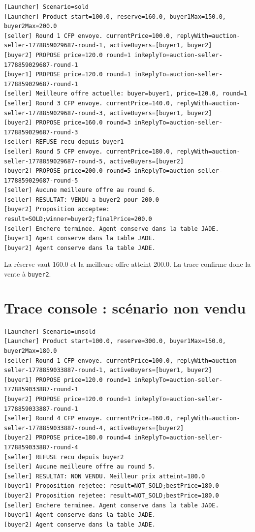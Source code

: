 \documentclass[11pt,a4paper]{report}
\begin{document}
\begin{lstlisting}
[Launcher] Scenario=sold
[Launcher] Product start=100.0, reserve=160.0, buyer1Max=150.0, buyer2Max=200.0
[seller] Round 1 CFP envoye. currentPrice=100.0, replyWith=auction-seller-1778859029687-round-1, activeBuyers=[buyer1, buyer2]
[buyer2] PROPOSE price=120.0 round=1 inReplyTo=auction-seller-1778859029687-round-1
[buyer1] PROPOSE price=120.0 round=1 inReplyTo=auction-seller-1778859029687-round-1
[seller] Meilleure offre actuelle: buyer=buyer1, price=120.0, round=1
[seller] Round 3 CFP envoye. currentPrice=140.0, replyWith=auction-seller-1778859029687-round-3, activeBuyers=[buyer1, buyer2]
[buyer2] PROPOSE price=160.0 round=3 inReplyTo=auction-seller-1778859029687-round-3
[seller] REFUSE recu depuis buyer1
[seller] Round 5 CFP envoye. currentPrice=180.0, replyWith=auction-seller-1778859029687-round-5, activeBuyers=[buyer2]
[buyer2] PROPOSE price=200.0 round=5 inReplyTo=auction-seller-1778859029687-round-5
[seller] Aucune meilleure offre au round 6.
[seller] RESULTAT: VENDU a buyer2 pour 200.0
[buyer2] Proposition acceptee: result=SOLD;winner=buyer2;finalPrice=200.0
[seller] Enchere terminee. Agent conserve dans la table JADE.
[buyer1] Agent conserve dans la table JADE.
[buyer2] Agent conserve dans la table JADE.
\end{lstlisting}

\begin{resultbox}
La réserve vaut 160.0 et la meilleure offre atteint 200.0. La trace confirme donc la vente à \texttt{buyer2}.
\end{resultbox}

\section{Trace console : scénario non vendu}

\begin{lstlisting}
[Launcher] Scenario=unsold
[Launcher] Product start=100.0, reserve=300.0, buyer1Max=150.0, buyer2Max=180.0
[seller] Round 1 CFP envoye. currentPrice=100.0, replyWith=auction-seller-1778859033887-round-1, activeBuyers=[buyer1, buyer2]
[buyer1] PROPOSE price=120.0 round=1 inReplyTo=auction-seller-1778859033887-round-1
[buyer2] PROPOSE price=120.0 round=1 inReplyTo=auction-seller-1778859033887-round-1
[seller] Round 4 CFP envoye. currentPrice=160.0, replyWith=auction-seller-1778859033887-round-4, activeBuyers=[buyer2]
[buyer2] PROPOSE price=180.0 round=4 inReplyTo=auction-seller-1778859033887-round-4
[seller] REFUSE recu depuis buyer2
[seller] Aucune meilleure offre au round 5.
[seller] RESULTAT: NON VENDU. Meilleur prix atteint=180.0
[buyer1] Proposition rejetee: result=NOT_SOLD;bestPrice=180.0
[buyer2] Proposition rejetee: result=NOT_SOLD;bestPrice=180.0
[seller] Enchere terminee. Agent conserve dans la table JADE.
[buyer1] Agent conserve dans la table JADE.
[buyer2] Agent conserve dans la table JADE.
\end{lstlisting}
\end{document}
